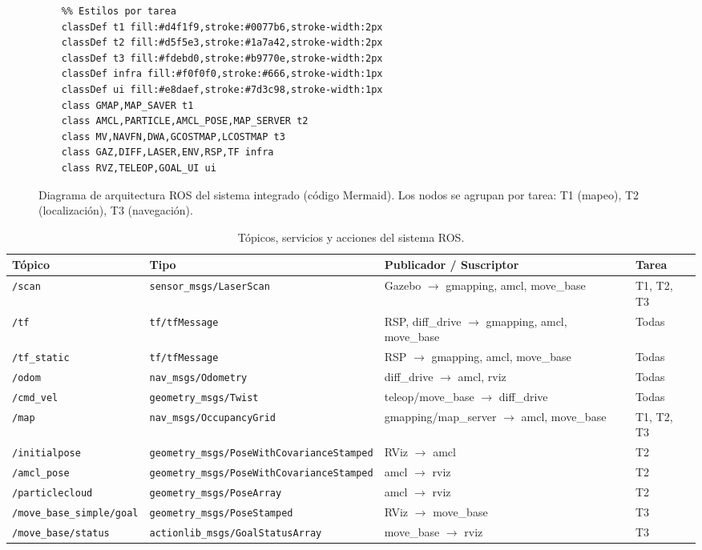 \documentclass[12pt,letterpaper]{article}
\begin{document}
\begin{figure}[H]
\begin{minipage}{0.95\textwidth}
\begin{lstlisting}
    %% Estilos por tarea
    classDef t1 fill:#d4f1f9,stroke:#0077b6,stroke-width:2px
    classDef t2 fill:#d5f5e3,stroke:#1a7a42,stroke-width:2px
    classDef t3 fill:#fdebd0,stroke:#b9770e,stroke-width:2px
    classDef infra fill:#f0f0f0,stroke:#666,stroke-width:1px
    classDef ui fill:#e8daef,stroke:#7d3c98,stroke-width:1px
    class GMAP,MAP_SAVER t1
    class AMCL,PARTICLE,AMCL_POSE,MAP_SERVER t2
    class MV,NAVFN,DWA,GCOSTMAP,LCOSTMAP t3
    class GAZ,DIFF,LASER,ENV,RSP,TF infra
    class RVZ,TELEOP,GOAL_UI ui
\end{lstlisting}
    \end{minipage}
    \caption{Diagrama de arquitectura ROS del sistema integrado (código Mermaid). Los nodos se agrupan por tarea: T1 (mapeo), T2 (localización), T3 (navegación).}
    \label{fig:arquitectura}
\end{figure}

\begin{table}[H]
    \centering
    \caption{Tópicos, servicios y acciones del sistema ROS.}
    \label{tab:topicos}
    \small
    \begin{tabular}{llll}
        \hline
        \textbf{Tópico} & \textbf{Tipo} & \textbf{Publicador / Suscriptor} & \textbf{Tarea} \\
        \hline
        \texttt{/scan} & \texttt{sensor\_msgs/LaserScan} & Gazebo $\rightarrow$ gmapping, amcl, move\_base & T1, T2, T3 \\
        \texttt{/tf} & \texttt{tf/tfMessage} & RSP, diff\_drive $\rightarrow$ gmapping, amcl, move\_base & Todas \\
        \texttt{/tf\_static} & \texttt{tf/tfMessage} & RSP $\rightarrow$ gmapping, amcl, move\_base & Todas \\
        \texttt{/odom} & \texttt{nav\_msgs/Odometry} & diff\_drive $\rightarrow$ amcl, rviz & Todas \\
        \texttt{/cmd\_vel} & \texttt{geometry\_msgs/Twist} & teleop/move\_base $\rightarrow$ diff\_drive & Todas \\
        \texttt{/map} & \texttt{nav\_msgs/OccupancyGrid} & gmapping/map\_server $\rightarrow$ amcl, move\_base & T1, T2, T3 \\
        \texttt{/initialpose} & \texttt{geometry\_msgs/PoseWithCovarianceStamped} & RViz $\rightarrow$ amcl & T2 \\
        \texttt{/amcl\_pose} & \texttt{geometry\_msgs/PoseWithCovarianceStamped} & amcl $\rightarrow$ rviz & T2 \\
        \texttt{/particlecloud} & \texttt{geometry\_msgs/PoseArray} & amcl $\rightarrow$ rviz & T2 \\
        \texttt{/move\_base\_simple/goal} & \texttt{geometry\_msgs/PoseStamped} & RViz $\rightarrow$ move\_base & T3 \\
        \texttt{/move\_base/status} & \texttt{actionlib\_msgs/GoalStatusArray} & move\_base $\rightarrow$ rviz & T3 \\
        \hline
    \end{tabular}
\end{table}
\end{document}
